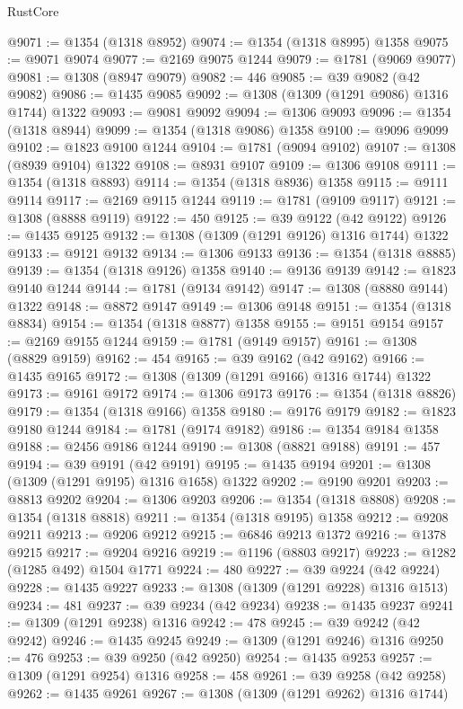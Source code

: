 \begin{lexlean}{RustCore}
\begin{coremodule}
@9071 := @1354 (@1318 @8952)
@9074 := @1354 (@1318 @8995) @1358
@9075 := @9071 @9074
@9077 := @2169 @9075 @1244
@9079 := @1781 (@9069 @9077)
@9081 := @1308 (@8947 @9079)
@9082 := 446
@9085 := @39 @9082 (@42 @9082)
@9086 := @1435 @9085
@9092 := @1308 (@1309 (@1291 @9086) @1316 @1744) @1322
@9093 := @9081 @9092
@9094 := @1306 @9093
@9096 := @1354 (@1318 @8944)
@9099 := @1354 (@1318 @9086) @1358
@9100 := @9096 @9099
@9102 := @1823 @9100 @1244
@9104 := @1781 (@9094 @9102)
@9107 := @1308 (@8939 @9104) @1322
@9108 := @8931 @9107
@9109 := @1306 @9108
@9111 := @1354 (@1318 @8893)
@9114 := @1354 (@1318 @8936) @1358
@9115 := @9111 @9114
@9117 := @2169 @9115 @1244
@9119 := @1781 (@9109 @9117)
@9121 := @1308 (@8888 @9119)
@9122 := 450
@9125 := @39 @9122 (@42 @9122)
@9126 := @1435 @9125
@9132 := @1308 (@1309 (@1291 @9126) @1316 @1744) @1322
@9133 := @9121 @9132
@9134 := @1306 @9133
@9136 := @1354 (@1318 @8885)
@9139 := @1354 (@1318 @9126) @1358
@9140 := @9136 @9139
@9142 := @1823 @9140 @1244
@9144 := @1781 (@9134 @9142)
@9147 := @1308 (@8880 @9144) @1322
@9148 := @8872 @9147
@9149 := @1306 @9148
@9151 := @1354 (@1318 @8834)
@9154 := @1354 (@1318 @8877) @1358
@9155 := @9151 @9154
@9157 := @2169 @9155 @1244
@9159 := @1781 (@9149 @9157)
@9161 := @1308 (@8829 @9159)
@9162 := 454
@9165 := @39 @9162 (@42 @9162)
@9166 := @1435 @9165
@9172 := @1308 (@1309 (@1291 @9166) @1316 @1744) @1322
@9173 := @9161 @9172
@9174 := @1306 @9173
@9176 := @1354 (@1318 @8826)
@9179 := @1354 (@1318 @9166) @1358
@9180 := @9176 @9179
@9182 := @1823 @9180 @1244
@9184 := @1781 (@9174 @9182)
@9186 := @1354 @9184 @1358
@9188 := @2456 @9186 @1244
@9190 := @1308 (@8821 @9188)
@9191 := 457
@9194 := @39 @9191 (@42 @9191)
@9195 := @1435 @9194
@9201 := @1308 (@1309 (@1291 @9195) @1316 @1658) @1322
@9202 := @9190 @9201
@9203 := @8813 @9202
@9204 := @1306 @9203
@9206 := @1354 (@1318 @8808)
@9208 := @1354 (@1318 @8818)
@9211 := @1354 (@1318 @9195) @1358
@9212 := @9208 @9211
@9213 := @9206 @9212
@9215 := @6846 @9213 @1372
@9216 := @1378 @9215
@9217 := @9204 @9216
@9219 := @1196 (@8803 @9217)
@9223 := @1282 (@1285 @492) @1504 @1771
@9224 := 480
@9227 := @39 @9224 (@42 @9224)
@9228 := @1435 @9227
@9233 := @1308 (@1309 (@1291 @9228) @1316 @1513)
@9234 := 481
@9237 := @39 @9234 (@42 @9234)
@9238 := @1435 @9237
@9241 := @1309 (@1291 @9238) @1316
@9242 := 478
@9245 := @39 @9242 (@42 @9242)
@9246 := @1435 @9245
@9249 := @1309 (@1291 @9246) @1316
@9250 := 476
@9253 := @39 @9250 (@42 @9250)
@9254 := @1435 @9253
@9257 := @1309 (@1291 @9254) @1316
@9258 := 458
@9261 := @39 @9258 (@42 @9258)
@9262 := @1435 @9261
@9267 := @1308 (@1309 (@1291 @9262) @1316 @1744)

\end{coremodule}
\end{lexlean}
